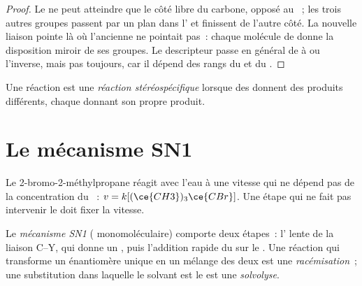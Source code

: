 \begin{proof}
Le  ne peut atteindre que le côté libre du carbone, opposé au
~; les trois autres groupes passent par un plan dans
l' et finissent de l'autre côté. La nouvelle liaison
pointe là où l'ancienne ne pointait pas~: chaque molécule de 
donne la disposition miroir de ses groupes. Le descripteur passe en
général de  à  ou l'inverse, mais pas toujours, car il
dépend des rangs du  et du .
\end{proof}

\begin{definition}\label{def:b1:nucleophilic-substitution:stereospecific}
Une réaction est une \emph{réaction stéréospécifique}
lorsque des   donnent des produits
 différents, chaque  donnant son propre produit.
\end{definition}

\section{Le mécanisme SN1}

Le 2-bromo-2-méthylpropane réagit avec l'eau à une vitesse qui ne dépend
pas de la concentration du ~: $v = k[(\ce{CH3})_3\ce{CBr}]$.
Une étape qui ne fait pas intervenir le  doit fixer la
vitesse.

\begin{definition}\label{def:b1:nucleophilic-substitution:sn1}
Le \emph{mécanisme SN1} (
monomoléculaire) comporte deux étapes~: l' lente de la liaison
C--Y, qui donne un , puis l'addition rapide du 
sur le . Une réaction qui transforme un énantiomère unique en
un mélange des deux est une \emph{racémisation}~; une substitution
dans laquelle le solvant est le  est une
\emph{solvolyse}.
\end{definition}

